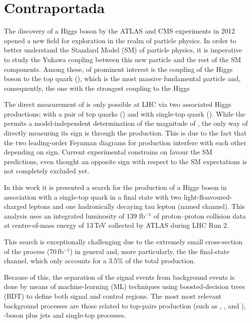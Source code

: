 
\chapter*{Contraportada}


The discovery of a Higgs boson by the ATLAS and CMS experiments in 2012 
opened a new field for exploration in the realm of particle physics.
In order to better understand the Standard Model (SM) of particle physics, 
it is imperative to study the Yukawa coupling between this new particle and
the rest of the SM components. 
Among these, of prominent interest is the coupling of the Higgs boson to the top 
quark (\yt), which is the most massive fundamental particle and, consequently, the one 
with the strongest coupling to the Higgs

The direct measurement of \yt is only possible at LHC via two associated Higgs 
productions; with a pair of top quarks (\ttH) and with single-top quark (\tHq).
While the \ttH permits a model-independent determination of the magnitude of \yt, 
the only way of directly measuring its sign is through the \tHq production. This is due 
to the fact that the two leading-order Feynman diagrams for \tHq production interfere 
with each other depending on \yt sign. 
Current experimental constrains on \yt favour the SM predictions, even thought an 
opposite sign with respect to the SM expectations is not completely excluded yet.

In this work it is presented a search for the production of a Higgs boson in association 
with a single-top quark in a final state with two light-floavoured-charged leptons and one 
hadronically decaying tau lepton (named \dileptau channel). This analysis uses an integrated 
luminosity of 139 fb$^{-1}$ of proton--proton collision data at centre-of-mass energy of 
13$\,$TeV collected by ATLAS during LHC Run 2. 


This search is exceptionally challenging due to the extremely small cross-section of 
the \tHq process (70$\,$fb$^{-1}$) in general and, more particularly, the the \dileptau
final-state channel, which only accounts for a 3.5\% of the total \tHq production.

Because of this, the separation of the \tHq signal events from background events is 
done by means of machine-learning (ML) techniques using boosted-decision trees 
(BDT) to define both signal and control regions. The most most relevant background 
processes are those related to top-pairs production (such as \ttbar, \ttH, \ttZ and 
\ttW), \PZ-boson plus jets and single-top processes.


